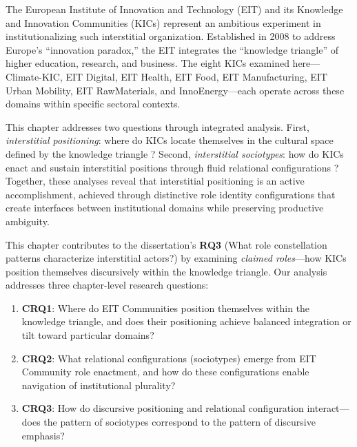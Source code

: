 \documentclass[../main.tex]{subfiles}
\begin{document}
The European Institute of Innovation and Technology (EIT) and its Knowledge and Innovation Communities (KICs) represent an ambitious experiment in institutionalizing such interstitial organization. Established in 2008 to address Europe's ``innovation paradox,'' the EIT integrates the ``knowledge triangle'' of higher education, research, and business. The eight KICs examined here---Climate-KIC, EIT Digital, EIT Health, EIT Food, EIT Manufacturing, EIT Urban Mobility, EIT RawMaterials, and InnoEnergy---each operate across these domains within specific sectoral contexts.

This chapter addresses two questions through integrated analysis. First, \textit{interstitial positioning}: where do KICs locate themselves in the cultural space defined by the knowledge triangle \cite{oberg2017culture,korff2015social}? Second, \textit{interstitial sociotypes}: how do KICs enact and sustain interstitial positions through fluid relational configurations \cite{jancsary2017structural}? Together, these analyses reveal that interstitial positioning is an active accomplishment, achieved through distinctive role identity configurations that create interfaces between institutional domains while preserving productive ambiguity.

This chapter contributes to the dissertation's \textbf{RQ3} (What role constellation patterns characterize interstitial actors?) by examining \emph{claimed roles}---how KICs position themselves discursively within the knowledge triangle. Our analysis addresses three chapter-level research questions:

\begin{enumerate}
    \item \textbf{CRQ1}: Where do EIT Communities position themselves within the knowledge triangle, and does their positioning achieve balanced integration or tilt toward particular domains?
    \item \textbf{CRQ2}: What relational configurations (sociotypes) emerge from EIT Community role enactment, and how do these configurations enable navigation of institutional plurality?
    \item \textbf{CRQ3}: How do discursive positioning and relational configuration interact---does the pattern of sociotypes correspond to the pattern of discursive emphasis?
\end{enumerate}
\end{document}
